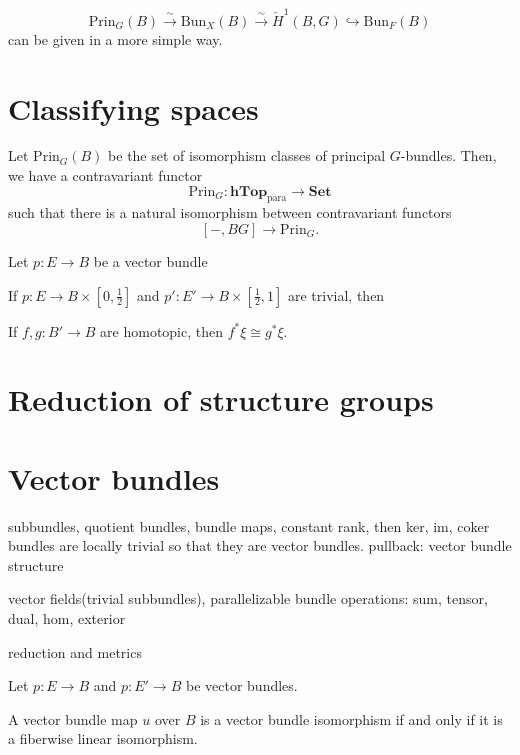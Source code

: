 \documentclass{../../large}
\begin{document}
\begin{prb}

\[\mathrm{Prin}_G(B)\xrightarrow{\sim}\mathrm{Bun}_X(B)\xrightarrow{\sim}\check H^1(B,G)\hookrightarrow\mathrm{Bun}_F(B)\]
can be given in a more simple way.

\end{prb}




\section{Classifying spaces}

Let $\mathrm{Prin}_G(B)$ be the set of isomorphism classes of principal $G$-bundles.
Then, we have a contravariant functor
\[\mathrm{Prin}_G:\mathbf{hTop}_{\mathrm{para}}\to\mathbf{Set}\]
such that there is a natural isomorphism between contravariant functors
\[[-,BG]\to\mathrm{Prin}_G.\]


\begin{prb}
Let $p:E\to B$ be a vector bundle
\begin{parts}
\item If $p:E\to B\times[0,\frac12]$ and $p':E'\to B\times[\frac12,1]$ are trivial, then 
\item If $f,g:B'\to B$ are homotopic, then $f^*\xi\cong g^*\xi$.
\end{parts}
\end{prb}

\begin{prb}

\end{prb}

\section{Reduction of structure groups}

\section{Vector bundles}
subbundles, quotient bundles, bundle maps,
constant rank, then ker, im, coker bundles are locally trivial so that they are vector bundles.
pullback: vector bundle structure

vector fields(trivial subbundles), parallelizable
bundle operations: sum, tensor, dual, hom, exterior

reduction and metrics

\begin{prb}
Let $p:E\to B$ and $p:E'\to B$ be vector bundles.
\begin{parts}
\item A vector bundle map $u$ over $B$ is a vector bundle isomorphism if and only if it is a fiberwise linear isomorphism.
\end{parts}
\end{prb}
\end{document}
